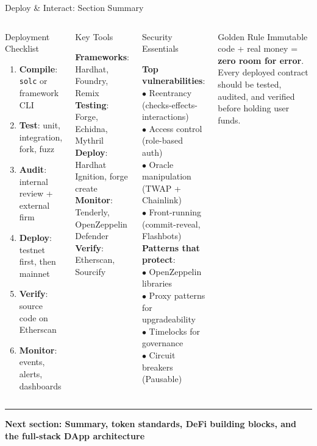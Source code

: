 \documentclass[8pt,aspectratio=169]{beamer}
\newcommand{\bottomnote}[1]{\vfill\vspace{-2mm}\textcolor{mllavender2}{\rule{\textwidth}{0.4pt}}\vspace{1mm}\footnotesize\textbf{#1}}
\begin{document}
\begin{frame}{Deploy \& Interact: Section Summary}
\begin{columns}
\begin{block}{Deployment Checklist}
\colorbox{mlgreen!10}{\parbox{0.92\linewidth}{\small
\begin{enumerate}
  \item[$\checkmark$] \textbf{Compile}: \texttt{solc} or framework CLI
  \item[$\checkmark$] \textbf{Test}: unit, integration, fork, fuzz
  \item[$\checkmark$] \textbf{Audit}: internal review + external firm
  \item[$\checkmark$] \textbf{Deploy}: testnet first, then mainnet
  \item[$\checkmark$] \textbf{Verify}: source code on Etherscan
  \item[$\checkmark$] \textbf{Monitor}: events, alerts, dashboards
\end{enumerate}
}}
\end{block}
\vspace{1mm}
\begin{block}{Key Tools}
\colorbox{mlblue!10}{\parbox{0.92\linewidth}{\small
\textbf{Frameworks}: Hardhat, Foundry, Remix\\
\textbf{Testing}: Forge, Echidna, Mythril\\
\textbf{Deploy}: Hardhat Ignition, forge create\\
\textbf{Monitor}: Tenderly, OpenZeppelin Defender\\
\textbf{Verify}: Etherscan, Sourcify
}}
\end{block}
\begin{block}{Security Essentials}
\colorbox{mlred!10}{\parbox{0.92\linewidth}{\small
\textbf{Top vulnerabilities}:\\
$\bullet$ Reentrancy (checks-effects-interactions)\\
$\bullet$ Access control (role-based auth)\\
$\bullet$ Oracle manipulation (TWAP + Chainlink)\\
$\bullet$ Front-running (commit-reveal, Flashbots)\\[2mm]
\textbf{Patterns that protect}:\\
$\bullet$ OpenZeppelin libraries\\
$\bullet$ Proxy patterns for upgradeability\\
$\bullet$ Timelocks for governance\\
$\bullet$ Circuit breakers (Pausable)
}}
\end{block}
\vspace{1mm}
\begin{alertblock}{Golden Rule}
\small Immutable code + real money = \textbf{zero room for error}. Every deployed contract should be tested, audited, and verified before holding user funds.
\end{alertblock}
\end{columns}
\bottomnote{Next section: Summary, token standards, DeFi building blocks, and the full-stack DApp architecture}
\end{frame}
\end{document}
